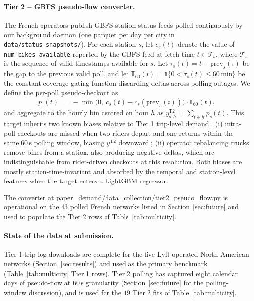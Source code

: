 \documentclass[11pt,a4paper]{article}
\begin{document}
\paragraph{Tier 2 -- GBFS pseudo-flow converter.}
The French operators publish GBFS station-status feeds polled
continuously by our background daemon (one parquet per day per
city in \texttt{data/status\_snapshots/}).  For each station
$s$, let $c_s(t)$ denote the value of
\texttt{num\_bikes\_available} reported by the GBFS feed at
fetch time $t \in \mathcal{T}_s$, where $\mathcal{T}_s$ is the
sequence of valid timestamps available for $s$.  Let
$\tau_s(t) = t - \mathrm{prev}_s(t)$ be the gap to the previous
valid poll, and let $\mathbb{T}_{60}(t) =
\mathbb{1}\{0 < \tau_s(t) \leq 60\,\text{min}\}$ be the
constant-coverage gating function discarding deltas across
polling outages.  We define the per-poll pseudo-checkout as
\begin{equation}
    p_s(t) \;=\; -\min\!\bigl(0,\;c_s(t) - c_s(\mathrm{prev}_s(t))\bigr) \cdot \mathbb{T}_{60}(t),
    \label{eq:pseudoflow}
\end{equation}
and aggregate to the hourly bin centred on hour $h$ as
$y^{\mathrm{T2}}_{s,h} = \sum_{t \in h} p_s(t)$.  This target
inherits two known biases relative to Tier 1 trip-level demand :
(i) intra-poll checkouts are missed when two riders depart and
one returns within the same $60$\,s polling window, biasing
$y^{\mathrm{T2}}$ downward ; (ii) operator rebalancing trucks
remove bikes from a station, also producing negative deltas,
which are indistinguishable from rider-driven checkouts at this
resolution.  Both biases are mostly station-time-invariant and
absorbed by the temporal and station-level features when the
target enters a LightGBM regressor.

The converter at
\url{paper_demand/data_collection/tier2_pseudo_flow.py} is
operational on the $43$ polled French networks listed in
Section~\ref{sec:future} and used to populate the Tier 2 rows of
Table~\ref{tab:multicity}.

\paragraph{State of the data at submission.}
Tier 1 trip-log downloads are complete for the five
Lyft-operated North American networks
(Section~\ref{sec:results}) and used as the primary benchmark
(Table~\ref{tab:multicity} Tier 1 rows).  Tier 2 polling has
captured eight calendar days of pseudo-flow at $60$\,s
granularity (Section~\ref{sec:future} for the polling-window
discussion), and is used for the $19$ Tier 2 fits of
Table~\ref{tab:multicity}.
\end{document}
